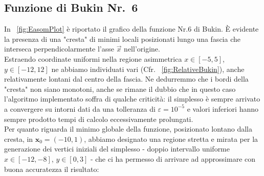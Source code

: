\begin{figure}
	\label{fig:Goldstein}
\end{figure}

\newpage

\subsection*{Funzione di Bukin Nr.~6}

In \figurename~\ref{fig:EasomPlot} è riportato il grafico della funzione Nr.6 di Bukin. \`E evidente la presenza di una "cresta" di minimi locali posizionati lungo una fascia che interseca perpendicolarmente l'asse $\vec{x}$  nell'origine.\\

\noindent Estraendo coordinate uniformi  nella regione asimmetrica $x\in[-5,5]$, $y\in[-12,12]$ ne abbiamo individuati vari (Cfr. \figurename~\ref{fig:RelativeBukin}), anche relativamente lontani dal centro della fascia. Ne dedurremmo che i bordi della "cresta" non siano monotoni, anche se rimane il dubbio che in questo caso l'algoritmo implementato soffra di qualche criticità: il simplesso è sempre arrivato a convergere su intorni dati da una tolleranza di $\varepsilon=10^{-5}$ e valori inferiori hanno sempre prodotto tempi di calcolo eccessivamente prolungati.\\

\noindent Per quanto riguarda il minimo globale della funzione, posizionato lontano dalla cresta, in $\mathbf{x}_0 = (-10,1)$, abbiamo designato una regione stretta e mirata per la generazione dei vertici iniziali del simplesso - doppio intervallo uniforme $x\in[-12,-8]$, $y\in[0,3]$ - che ci ha permesso di arrivare ad approssimare con buona accuratezza il risultato:

